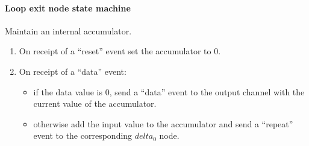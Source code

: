 \paragraph{Loop exit node state machine}

Maintain an internal accumulator.

\begin{enumerate}
    \item On receipt of a ``reset'' event set the accumulator to 0.
    \item On receipt of a ``data'' event: 
    \begin{itemize} 
        \item if the data value is 0, send a ``data'' event to the output 
        channel with the current value of the accumulator.
        \item otherwise add the input value to the accumulator and send a
        ``repeat'' event to the corresponding $delta_0$ node.
    \end{itemize}
\end{enumerate}